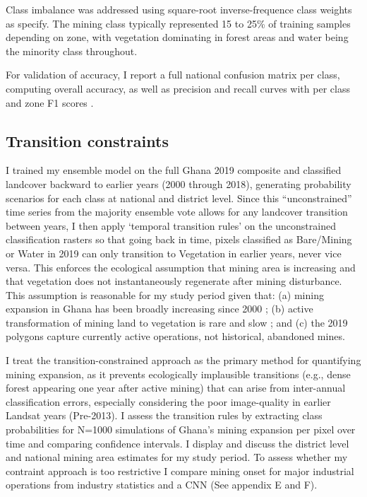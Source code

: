 \documentclass[]{interact}
\begin{document}
Class imbalance was addressed using square-root inverse-frequence class weights as \citet{buda2018systematic} specify. The mining class typically represented 15 to 25\% of training samples depending on zone, with vegetation dominating in forest areas and water being the minority class throughout.

For validation of accuracy, I report a full national confusion matrix per class, computing overall accuracy, as well as precision and recall curves with per class and zone F1 scores \citep{olofsson2014Good,tharwat2020Classification,stehman2019Key}. 

\subsection{Transition constraints}
I trained my ensemble model on the full Ghana 2019 composite and classified landcover backward to earlier years (2000 through 2018), generating probability scenarios for each class at national and district level. Since this ``unconstrained'' time series from the majority ensemble vote allows for any landcover transition between years, I then apply `temporal transition rules' on the unconstrained classification rasters so that going back in time, pixels classified as Bare/Mining or Water in 2019 can only transition to Vegetation in earlier years, never vice versa. This enforces the ecological assumption that mining area is increasing and that vegetation does not instantaneously regenerate after mining disturbance. This assumption is reasonable for my study period given that: (a) mining expansion in Ghana has been broadly increasing since 2000 \citep{mcquilken2016Artisanal,aikins2024Ghana,asori2022illegal}; (b) active transformation of mining land to vegetation is rare and slow \citep{barenblitt2021large}; and (c) the 2019 polygons capture currently active operations, not historical, abandoned mines.

I treat the transition-constrained approach as the primary method for quantifying mining expansion, as it prevents ecologically implausible transitions (e.g., dense forest appearing one year after active mining) that can arise from inter-annual classification errors, especially considering the poor image-quality in earlier Landsat years (Pre-2013). I assess the transition rules by extracting class probabilities for N=1000 simulations of Ghana's mining expansion per pixel over time and comparing confidence intervals. I display and discuss the district level and national mining area estimates for my study period. To assess whether my contraint approach is too restrictive I compare mining onset for major industrial operations from industry statistics and a CNN (See appendix E and F).
\end{document}
